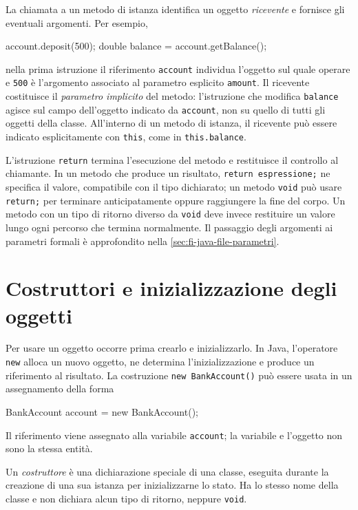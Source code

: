La chiamata a un metodo di istanza identifica un oggetto
\emph{ricevente} e fornisce gli eventuali argomenti. Per esempio,

\begin{unipdcode}[language=Java]
account.deposit(500);
double balance = account.getBalance();
\end{unipdcode}

nella prima istruzione il riferimento \texttt{account} individua
l'oggetto sul quale operare e \texttt{500} è l'argomento associato
al parametro esplicito \texttt{amount}. Il ricevente costituisce il
\emph{parametro implicito} del metodo: l'istruzione che modifica
\texttt{balance} agisce sul campo dell'oggetto indicato da
\texttt{account}, non su quello di tutti gli oggetti della classe.
All'interno di un metodo di istanza, il ricevente può essere
indicato esplicitamente con \texttt{this}, come in
\texttt{this.balance}.

L'istruzione \texttt{return} termina l'esecuzione del metodo e
restituisce il controllo al chiamante. In un metodo che produce
un risultato, \texttt{return espressione;} ne specifica il valore,
compatibile con il tipo dichiarato; un metodo \texttt{void} può
usare \texttt{return;} per terminare anticipatamente oppure
raggiungere la fine del corpo. Un metodo con un tipo di ritorno
diverso da \texttt{void} deve invece restituire un valore lungo
ogni percorso che termina normalmente. Il passaggio degli
argomenti ai parametri formali è approfondito nella
\cref{sec:fi-java-file-parametri}.

\section{Costruttori e inizializzazione degli oggetti}
\label{sec:fi-java-classi-costruttori}

Per usare un oggetto occorre prima crearlo e inizializzarlo. In Java,
l'operatore \texttt{new} alloca un nuovo oggetto, ne determina
l'inizializzazione e produce un riferimento al risultato. La
costruzione \texttt{new BankAccount()} può essere usata in un
assegnamento della forma

\begin{unipdcode}[language=Java]
BankAccount account = new BankAccount();
\end{unipdcode}

Il riferimento viene assegnato alla variabile \texttt{account};
la variabile e l'oggetto non sono la stessa entità.

\begin{definition}[Costruttore]
\label{def:fi-java-classi-costruttore}
Un \emph{costruttore} è una dichiarazione speciale di una classe,
eseguita durante la creazione di una sua istanza per inizializzarne
lo stato. Ha lo stesso nome della classe e non dichiara alcun tipo
di ritorno, neppure \texttt{void}.
\end{definition}

